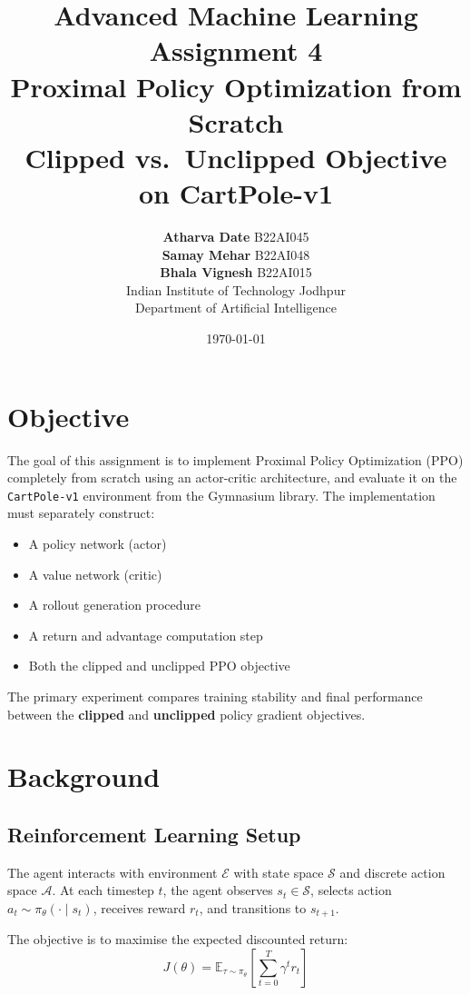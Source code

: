 \documentclass[12pt,a4paper]{article}
\title{
    \vspace{2cm}
    {\Large \textbf{Advanced Machine Learning}} \\[0.4cm]
    {\large Assignment 4} \\[0.6cm]
    {\LARGE \textbf{Proximal Policy Optimization from Scratch}} \\[0.3cm]
    {\large Clipped vs.\ Unclipped Objective on CartPole-v1} \\[1.5cm]
}
\author{
    \textbf{Atharva Date} \quad B22AI045 \\[0.2cm]
    \textbf{Samay Mehar} \quad B22AI048 \\[0.2cm]
    \textbf{Bhala Vignesh} \quad B22AI015 \\[0.8cm]
    \normalsize Indian Institute of Technology Jodhpur \\[0.2cm]
    \normalsize Department of Artificial Intelligence
}
\date{\today}
\begin{document}
\maketitle
\thispagestyle{empty}
\newpage

\tableofcontents
\newpage

\section{Objective}

The goal of this assignment is to implement Proximal Policy Optimization (PPO) \cite{schulman2017proximal} completely from scratch using an actor-critic architecture, and evaluate it on the \texttt{CartPole-v1} environment from the Gymnasium library. The implementation must separately construct:
\begin{itemize}[noitemsep]
    \item A policy network (actor)
    \item A value network (critic)
    \item A rollout generation procedure
    \item A return and advantage computation step
    \item Both the clipped and unclipped PPO objective
\end{itemize}

The primary experiment compares training stability and final performance between the \textbf{clipped} and \textbf{unclipped} policy gradient objectives.

\section{Background}

\subsection{Reinforcement Learning Setup}

The agent interacts with environment $\mathcal{E}$ with state space $\mathcal{S}$ and discrete action space $\mathcal{A}$. At each timestep $t$, the agent observes $s_t \in \mathcal{S}$, selects action $a_t \sim \pi_\theta(\cdot \mid s_t)$, receives reward $r_t$, and transitions to $s_{t+1}$.

The objective is to maximise the expected discounted return:
\[
J(\theta) = \mathbb{E}_{\tau \sim \pi_\theta} \left[ \sum_{t=0}^{T} \gamma^t r_t \right]
\]
\end{document}
